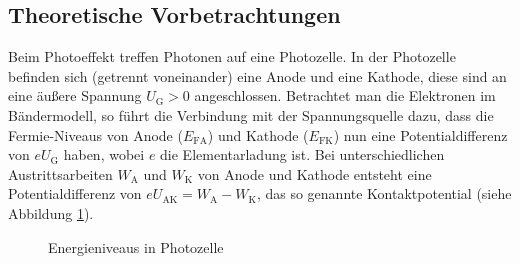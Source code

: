 \subsection{Theoretische Vorbetrachtungen}
Beim Photoeffekt treffen Photonen auf eine Photozelle. In der Photozelle befinden sich (getrennt voneinander) eine Anode und eine Kathode, diese sind an eine äußere Spannung $U_\mathrm{G}>0$ angeschlossen. Betrachtet man die Elektronen im Bändermodell, so führt die Verbindung mit der Spannungsquelle dazu, dass die Fermie-Niveaus von Anode ($E_\mathrm{FA}$) und Kathode ($E_\mathrm{FK}$) nun eine Potentialdifferenz von $e U_\mathrm{G}$ haben, wobei $e$ die Elementarladung ist. Bei unterschiedlichen Austrittsarbeiten $W_\mathrm{A}$ und $W_\mathrm{K}$ von Anode und Kathode entsteht eine Potentialdifferenz von $eU_\mathrm{AK}=W_\mathrm{A}-W_\mathrm{K}$, das so genannte Kontaktpotential (siehe Abbildung \ref{Photozelle}). 

\begin{figure}[h]
  \centering
  \caption{Energieniveaus in Photozelle}
  \label{Photozelle}
\end{figure}

